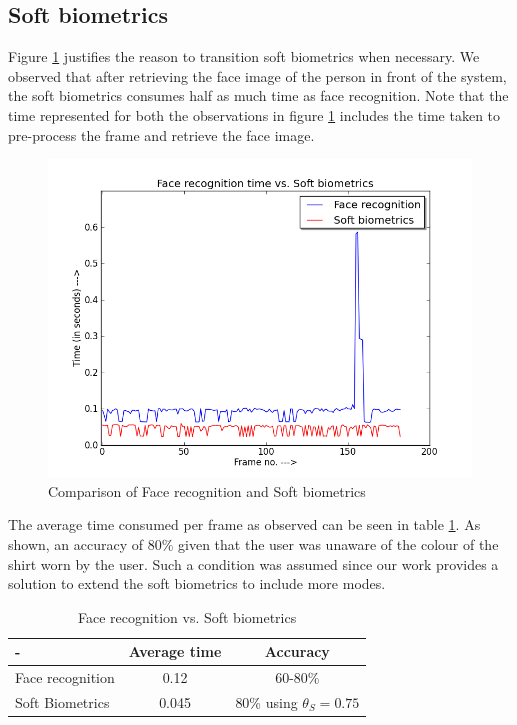 \documentclass[%
        submission,
        notitlepage,
        narroweqnarray,
        inline,
        ]{ieee}
\begin{document}
\subsection{Soft biometrics}
Figure \ref{fig:fsoft} justifies the reason to transition soft biometrics when necessary.
We observed that after retrieving the face image of the person in front of the system, the soft biometrics consumes half as much time as face recognition.
Note that the time represented for both the observations in figure \ref{fig:fsoft} includes the time taken to pre-process the frame and retrieve the face image.
\begin{figure}[h!]
	\centering
	\includegraphics[scale=0.40]{img/face_vs_soft.png}
	\caption{Comparison of Face recognition and Soft biometrics}
	\label{fig:fsoft}
\end{figure}
The average time consumed per frame as observed can be seen in table \ref{tab:frsb}.
As shown, an accuracy of 80\% given that the user was unaware of the colour of the shirt worn by the user.
Such a condition was assumed since our work provides a solution to extend the soft biometrics to include more modes.
\begin{table}[htp]
	\centering
	\caption{Face recognition vs. Soft biometrics}
	\begin{tabular}{||l|c|c||} \hline \hline
	-                  &  Average time  &  Accuracy \\ \hline
	Face recognition   &  0.12          &  60-80\% \\ \hline
	Soft Biometrics    &  0.045         &  80\% using $\theta_{S}=0.75$ \\ \hline \hline
	\end{tabular}
	\label{tab:frsb}
\end{table}
\end{document}
